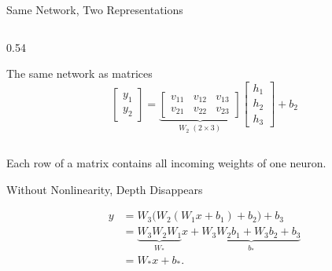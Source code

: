 \documentclass[aspectratio=169]{beamer}
\begin{document}
\begin{frame}{Same Network, Two Representations}
\begin{columns}[T]
\begin{column}{0.54\textwidth}
\begin{block}{The same network as matrices}
        \begin{equation*}
          \begin{bmatrix}y_1 \\ y_2
          \end{bmatrix}
          =
          \underbrace{
            \begin{bmatrix}
              v_{11} & v_{12} & v_{13} \\
              v_{21} & v_{22} & v_{23}
            \end{bmatrix}
          }_{W_2\; (2 \times 3)}
          \begin{bmatrix}h_1 \\ h_2 \\ h_3
          \end{bmatrix}
          + b_2
        \end{equation*}
      \end{block}
    \end{column}
  \end{columns}

  Each row of a matrix contains all incoming weights of one neuron.
\end{frame}

\begin{frame}{Without Nonlinearity, Depth Disappears}
  \centering

  \vspace{0.5em}
  \begin{align*}
    y
    &= W_3\bigl(W_2(W_1x+b_1)+b_2\bigr)+b_3 \\
    &= \underbrace{W_3W_2W_1}_{W_*}x
    + \underbrace{W_3W_2b_1+W_3b_2+b_3}_{b_*} \\
    &= W_*x+b_*.
  \end{align*}
\end{frame}
\end{document}
